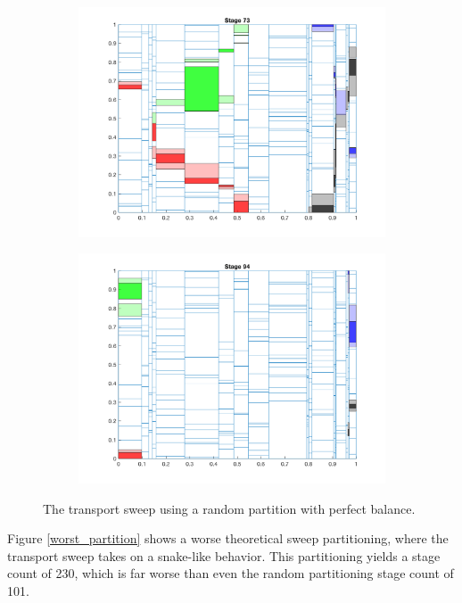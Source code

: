 \documentclass[11pt, letterpaper,titlepage,oneside]{article}
\begin{document}
\begin{figure}[H]
\begin{subfigure}{0.49\textwidth}
  \includegraphics[scale=0.5]{../figures/random_partition_3.png}
  \end{subfigure}
  \begin{subfigure}{0.49\textwidth}
  \includegraphics[scale=0.5]{../figures/random_partition_4.png}
  \end{subfigure}
  \caption{The transport sweep using a random partition with perfect balance.}
  \label{random_partition}
\end{figure}

Figure \ref{worst_partition} shows a worse theoretical sweep partitioning, where the transport sweep takes on a snake-like behavior. This partitioning yields a stage count of 230, which is far worse than even the random partitioning stage count of 101.
\end{document}
